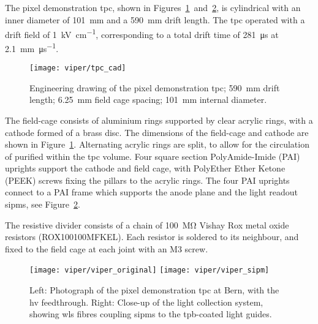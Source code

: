 \subsection{}
\label{sec:ac_viper_tpc}

The pixel demonstration \gls{tpc}, shown in Figures~\ref{fig:viper_cad}~and~\ref{fig:viper_v1per}, is cylindrical with an inner diameter of \SI{101}{\milli\metre} and a \SI{590}{\milli\metre} drift length. 
The \gls{tpc} operated with a drift field of \SI{1}{\kilo\volt\per\centi\metre}, corresponding to a total drift time of \SI{281}{\micro\second} at \SI{2.1}{\milli\metre\per\micro\second}.~\cite{protoLASER}

\begin{figure}[htb]
	\centering
	\texttt{[image: viper/tpc\_cad]}
	\caption{\small Engineering drawing of the pixel demonstration \gls{tpc}; \SI{590}{\milli\metre} drift length; \SI{6.25}{\milli\metre} field cage spacing; \SI{101}{\milli\metre} internal diameter.}
	\label{fig:viper_cad}
\end{figure}
 
The field-cage consists of aluminium rings supported by clear acrylic rings, with a cathode formed of a brass disc. 
The dimensions of the field-cage and cathode are shown in Figure~\ref{fig:viper_cad}.
Alternating acrylic rings are split, to allow for the circulation of purified \lar{} within the \gls{tpc} volume.
Four square section PolyAmide-Imide (PAI) uprights support the cathode and field cage, with PolyEther Ether Ketone (PEEK) screws fixing the pillars to the acrylic rings.
The four PAI uprights connect to a PAI frame which supports the anode plane and the light readout \glspl{sipm}, see Figure~\ref{fig:viper_v1per}.   

The resistive divider consists of a chain of \SI{100}{\mega\ohm} Vishay Rox metal oxide resistors (ROX100100MFKEL).
Each resistor is soldered to its neighbour, and fixed to the field cage at each joint with an M3 screw.   

\begin{figure}[htb]
	\centering
	\texttt{[image: viper/viper\_original]}
	\texttt{[image: viper/viper\_sipm]}
	\caption{\small  Left: Photograph of the  pixel demonstration \gls{tpc} at Bern, with the \gls{hv} feedthrough.
	Right: Close-up of the light collection system, showing \gls{wls} fibres coupling \glspl{sipm} to the \gls{tpb}-coated light guides.}
	\label{fig:viper_v1per}
\end{figure}

